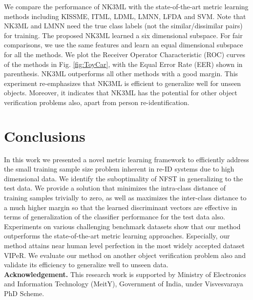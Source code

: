 \documentclass[runningheads]{llncs}
\begin{document}
We compare the performance of NK3ML with the state-of-the-art metric learning methods including KISSME\cite{KISSME}, ITML\cite{ITML}, LDML\cite{LDML}, LMNN\cite{LMNN1,LMNN2}, LFDA\cite{LFDA:ICML,LFDA:CVPR} and SVM\cite{SVM}. Note that NK3ML and LMNN need the true class labels (not the similar/dissimilar pairs) for training. The proposed NK3ML learned a six dimensional subspace. For fair comparisons, we use the same features and learn an equal dimensional subspace for all the methods. We plot the Receiver Operator Characteristic (ROC) curves of the methods in Fig. \ref{fig:ToyCar}, with the Equal Error Rate (EER) shown in parenthesis. NK3ML outperforms all other methods with a good margin. This experiment re-emphasizes that NK3ML is efficient to generalize well for unseen objects. Moreover, it indicates that NK3ML has the potential for other object verification problems also, apart from person re-identification.



\color{black}
\section{Conclusions}
\label{sec:Conclusion}
In this work we presented a novel metric learning framework to efficiently address the small training sample size problem inherent in re-ID systems due to high dimensional data.  We identify the suboptimality of NFST in generalizing to the test data. We provide a solution that  minimizes the intra-class distance of training samples trivially to zero, as well as maximizes the inter-class distance to a much higher margin so that the learned discriminant vectors are effective in terms of generalization of the classifier performance for the test data also. Experiments on various challenging benchmark datasets show that our method outperforms the state-of-the-art metric learning approaches. Especially, our method attains near human level perfection in the most widely accepted dataset VIPeR. We evaluate our method on another object verification problem also and validate its efficiency to generalize well to unseen data.\\

\noindent \textbf{Acknowledgement.} This research work is supported by Ministry of Electronics and Information Technology (MeitY), Government of India, under  Visvesvaraya PhD Scheme.



\end{document}
